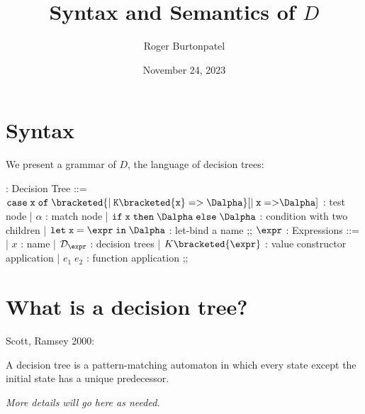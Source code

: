 \documentclass{article}
\title{Syntax and Semantics of $D$}
\author{Roger Burtonpatel}
\date{November 24, 2023}
\begin{document}
\maketitle

\section{Syntax}

We present a grammar of $D$, the language of decision trees: 


\begin{center}
  \begin{bnf}
    \Dalpha : \textsf{Decision Tree} ::= 
    $\tt{case} \; x \; \tt{of} \; 
    \bracketed{\vert \; K\bracketed{x} \; \tt{=>} \; \Dalpha}
    [\vert \; x \; \tt{=>} \Dalpha]$ : test node 
    | $\alpha$ : match node 
    | $\tt{if} \; x \; \tt{then} \; \Dalpha \; \tt{else} \; \Dalpha$ : condition with two children 
    | $\tt{let} \; x \; \tt{=} \; \expr \; \tt{in} \; \Dalpha$ : let-bind a name
    ;;
    $\expr$ : \textsf{Expressions} ::=
    | $x$ : name
    | $\mathcal{D}_{\expr}$ : decision trees 
    | $K \bracketed{\expr}$ : value constructor application 
    | $e_1 \; e_2$ : function application 
    ;;
  \end{bnf}
\end{center}

\section{What is a decision tree?}
Scott, Ramsey 2000: 

A decision tree is a pattern-matching automaton in which every state except the
initial state has a unique predecessor. 

\bigskip

\it{More details will go here as needed.}


\end{document}
